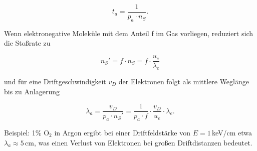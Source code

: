 \[t_a=\frac{1}{p_a\cdot n_S}  .\]

Wenn elektronegative Moleküle mit dem Anteil f im Gas vorliegen, reduziert sich die Stoßrate zu

\[n_S' = f\cdot n_S = f\cdot \frac{u_e}{\lambda_e} \]

und für eine Driftgeschwindigkeit $v_D$ der Elektronen folgt als mittlere Weglänge bis zu Anlagerung

\[\lambda_a = \frac{v_D}{p_a\cdot n_S'}=\frac{1}{p_a\cdot f}\cdot \frac{v_D}{u_e}\cdot \lambda_e  
.\]

Beispiel: 1\% O$_2$ in Argon ergibt bei einer Driftfeldstärke von $E=1\,$keV/cm etwa
$\lambda_a\approx5\,$cm, was einen Verlust von Elektronen bei großen Driftdistanzen bedeutet.
